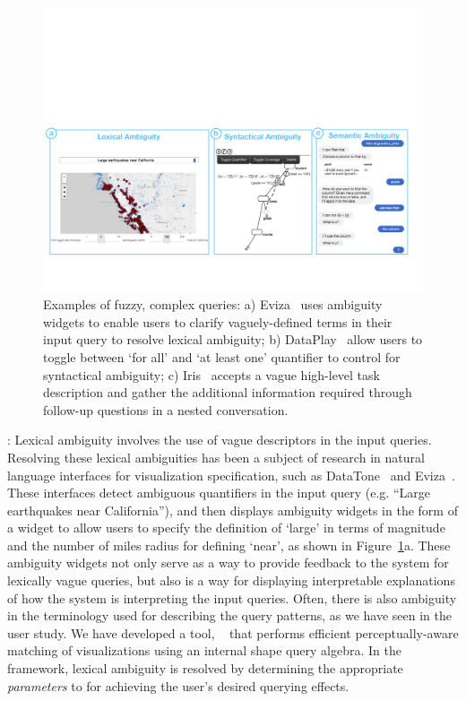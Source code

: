 \begin{figure}[h!]
\centering
\includegraphics[width=\textwidth]{figures/ambiguity.pdf}
\caption{Examples of fuzzy, complex queries: a) Eviza~\cite{Setlur2016} uses ambiguity widgets to enable users to clarify vaguely-defined terms in their input query to resolve lexical ambiguity; b) DataPlay~\cite{Abouzied2012} allow users to toggle between `for all' and `at least one' quantifier to control for syntactical ambiguity; c) Iris~\cite{Fast2018} accepts a vague high-level task description and gather the additional information required through follow-up questions in a nested conversation.}
\label{fig:ambiguity}
\end{figure}
: Lexical ambiguity involves the use of vague descriptors in the input queries. Resolving these lexical ambiguities has been a subject of research in natural language interfaces for visualization specification, such as DataTone~\cite{Gao2015} and Eviza~\cite{Setlur2016}. These interfaces detect ambiguous quantifiers in the input query (e.g. ``Large earthquakes near California''), and then displays ambiguity widgets in the form of a widget to allow users to specify the definition of `large' in terms of magnitude and the number of miles radius for defining `near', as shown in Figure~\ref{fig:ambiguity}a. These ambiguity widgets not only serve as a way to provide feedback to the system for lexically vague queries, but also is a way for displaying interpretable explanations of how the system is interpreting the input queries. Often, there is also ambiguity in the terminology used for describing the query patterns, as we have seen in the \zv user study. We have developed a tool, \ssearch~\cite{Siddiqui2018} that performs efficient  perceptually-aware matching of visualizations using an internal shape query algebra. In the \vida framework, lexical ambiguity is resolved by determining the appropriate \textit{parameters} to \vidaql for achieving the user's desired querying effects.
